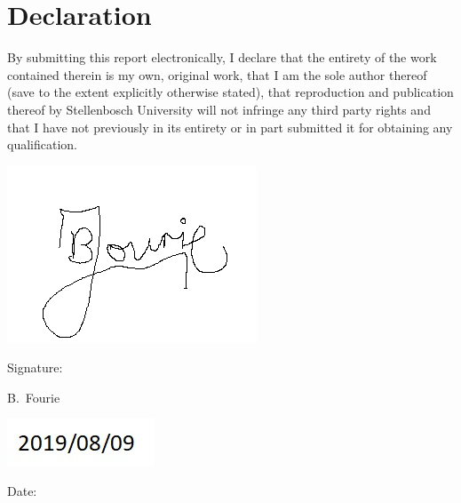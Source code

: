\chapter{Declaration}

By submitting this report electronically, I declare that the entirety of the work contained
therein is my own, original work, that I am the sole author thereof (save to the extent
explicitly otherwise stated), that reproduction and publication thereof by Stellenbosch
University will not infringe any third party rights and that I have not previously in its
entirety or in part submitted it for obtaining any qualification.

\vspace{3cm}

\includegraphics{./Figures/Signature.png}\\
\noindent%
\parbox{.5\textwidth}{%
  Signature:\quad\dotfill\par
  \hfill B.\ Fourie\hspace{1.2cm}\null}

\vspace{1.5cm}
\hspace{1.5cm}\includegraphics{./Figures/Date.jpg}\\  
\noindent%
\parbox{.5\textwidth}{%
  Date:\quad\dotfill\par}
